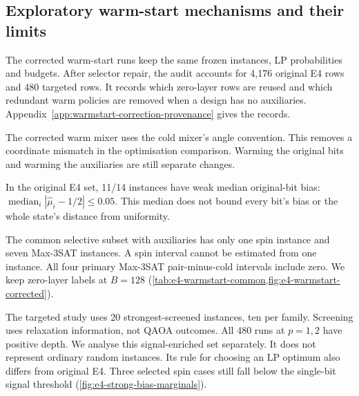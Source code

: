 \documentclass[a4paper,onecolumn,11pt,unpublished]{quantumarticle}
\theoremstyle{remark}
\begin{document}
\subsection{Exploratory warm-start mechanisms and their limits}
\label{sec:results-warmstart}

The corrected warm-start runs keep the same frozen instances, LP
probabilities and budgets. After selector repair, the audit accounts for
4,176 original E4 rows and 480 targeted rows. It records which zero-layer
rows are reused and which redundant warm policies are removed when a
design has no auxiliaries.
Appendix~\ref{app:warmstart-correction-provenance} gives the records.

The corrected warm mixer uses the cold mixer's angle convention.
This removes a coordinate mismatch in the optimisation comparison.
Warming the original bits and warming the auxiliaries are still separate
changes.

In the original E4 set, 11/14 instances have weak median original-bit bias:
$\operatorname{median}_i|\widehat\mu_i-1/2|\leq0.05$.
This median does not bound every bit's bias or the whole state's distance
from uniformity.

The common selective subset with auxiliaries has only one spin instance
and seven Max-3SAT instances. A spin interval cannot be estimated from
one instance. All four primary Max-3SAT pair-minus-cold intervals include
zero. We keep zero-layer labels at $B=128$
(\cref{tab:e4-warmstart-common,fig:e4-warmstart-corrected}).

\label{sec:results-strong-bias-warmstart}
The targeted study uses 20 strongest-screened instances, ten per family.
Screening uses relaxation information, not QAOA outcomes.
All 480 runs at $p=1,2$ have positive depth.
We analyse this signal-enriched set separately. It does not represent
ordinary random instances.
Its rule for choosing an LP optimum also differs from original E4.
Three selected spin cases still fall below the single-bit signal threshold
(\cref{fig:e4-strong-bias-marginals}).
\end{document}
